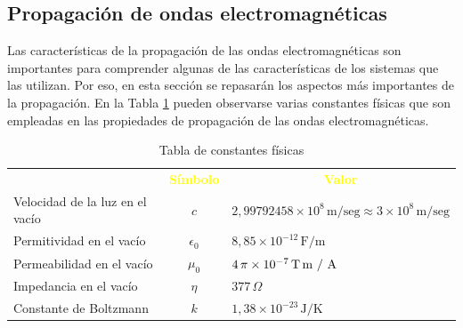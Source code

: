 \subsection{Propagaci\'on de ondas electromagn\'eticas}

Las caracter\'isticas de la propagaci\'on de las ondas electromagn\'eticas son importantes para comprender algunas de las caracter\'isticas de los sistemas que las utilizan. Por eso, en esta secci\'on se repasar\'an los aspectos m\'as importantes de la propagaci\'on. En la Tabla \ref{tab:06.constantes.fisicas} pueden observarse varias constantes f\'isicas que son empleadas en las propiedades de propagaci\'on de las ondas electromagn\'eticas.


\begin{table}[!h]
  \centering
  \caption{Tabla de constantes f\'isicas}
  \begin{tabular}{lcl}  \rowcolor{blue!50!black}
    \multicolumn{1}{c}{\textcolor{yellow}{\bf Constante}}
&   \multicolumn{1}{c}{\textcolor{yellow}{\bf S\'imbolo}}
&   \multicolumn{1}{c}{\textcolor{yellow}{\bf Valor}} \\

Velocidad de la luz en el vac\'io & $c$ & $2,99792458 \times 10^8\,\text{m/seg} \approx 3 \times 10^8\,\text{m/seg}$ \\ \hline
Permitividad en el vac\'io & $\epsilon_0$ & $8,85 \times 10^{-12} \,\text{F/m}$ \\ \hline
Permeabilidad en el vac\'io & $\mu_0$ & $ 4\,\pi \times 10^{-7} \,\text{T\,m / A}$ \\ \hline
Impedancia en el vac\'io & $\eta$ & $ 377\,\Omega$ \\ \hline
Constante de Boltzmann & $k$ &  $1,38 \times 10^{-23} \,\text{J/K}$ \\ \hline
  \end{tabular}

  \label{tab:06.constantes.fisicas}
\end{table}





